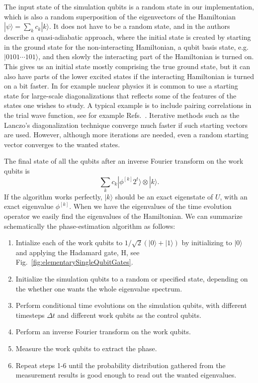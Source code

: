 The input state of the simulation qubits is a random state in our
implementation, which is
also a random superposition of the eigenvectors of the Hamiltonian
$|\psi\rangle=\sum_k c_k | k\rangle$. It does not have to be a random state,
and in \cite{lawu2002} the authors describe a quasi-adiabatic
approach, where the initial state is created by starting in the ground 
state for the non-interacting Hamiltonian, 
a qubit basis state, e.g. $|0101\cdots101\rangle$, 
and
then slowly the interacting part of the Hamiltonian is turned on.
This gives us an initial state mostly comprising the true ground state,
but it can also have parts of the lower excited states if the
interacting Hamiltonian is turned on a bit faster.
In for example nuclear physics it is common to use a starting state for large-scale
diagonalizations that reflects some of the features of the states one wishes to study.
A typical example is to include pairing correlations in the trial wave function, see
for example Refs.~\cite{caurier2005,rmp75mhj}.
Iterative methods such as the Lanczo's diagonalization technique  \cite{Whitehead1977,golub1996}
converge much faster if such starting vectors are used. However, although more iterations are needed,
even a random starting vector converges to the wanted states.
 
The final state of all the qubits
after an inverse Fourier transform on the work qubits is 
\begin{equation}
\label{eq:FinalState}
	\sum_{k}c_k |\phi^{[k]} 2^t\rangle \otimes |k\rangle.
\end{equation}
If the
algorithm works perfectly, $|k\rangle$  should be an exact eigenstate of
$U$, with an exact eigenvalue $\phi^{[k]}$.
When we have the 
eigenvalues of the time evolution operator we easily find 
the eigenvalues of the
Hamiltonian. 
We can summarize schematically the phase-estimation algorithm as follows:
\begin{enumerate}
\item Intialize each of the work qubits to $1/\sqrt2 ( |0\rangle  + |1\rangle )$
  by initializing to $ |0\rangle $ and applying the Hadamard gate, H,
  see Fig.~\ref{fig:elementarySingleQubitGates}.
\item Initialize the simulation qubits to a random or  specified
  state, depending on the whether one wants the whole eigenvalue
  spectrum. 
\item  Perform  conditional time evolutions on the simulation qubits, with
  different timesteps $\Delta t$ and different work qubits as the
  control qubits.
\item Perform an inverse Fourier transform on the work qubits.
\item Measure the work qubits to extract the phase.
\item Repeat steps 1-6 until the probability distribution gathered
  from the measurement results is good enough to read out the wanted
  eigenvalues. 
\end{enumerate} 


